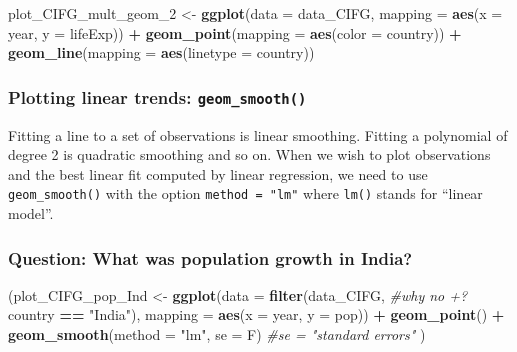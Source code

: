 \documentclass[11pt,]{article}
\newenvironment{Shaded}{\begin{snugshade}}{\end{snugshade}}
\newcommand{\KeywordTok}[1]{\textcolor[rgb]{0.13,0.29,0.53}{\textbf{#1}}}
\newcommand{\DataTypeTok}[1]{\textcolor[rgb]{0.13,0.29,0.53}{#1}}
\newcommand{\DecValTok}[1]{\textcolor[rgb]{0.00,0.00,0.81}{#1}}
\newcommand{\StringTok}[1]{\textcolor[rgb]{0.31,0.60,0.02}{#1}}
\newcommand{\CommentTok}[1]{\textcolor[rgb]{0.56,0.35,0.01}{\textit{#1}}}
\newcommand{\OperatorTok}[1]{\textcolor[rgb]{0.81,0.36,0.00}{\textbf{#1}}}
\newcommand{\NormalTok}[1]{#1}
\begin{document}
\begin{Shaded}
\begin{Highlighting}[]
\NormalTok{plot_CIFG_mult_geom_}\DecValTok{2}\NormalTok{ <-}\StringTok{ }\KeywordTok{ggplot}\NormalTok{(}\DataTypeTok{data =}\NormalTok{ data_CIFG, }
                                \DataTypeTok{mapping =} \KeywordTok{aes}\NormalTok{(}\DataTypeTok{x =}\NormalTok{ year, }
                                              \DataTypeTok{y =}\NormalTok{ lifeExp)) }\OperatorTok{+}
\StringTok{  }\KeywordTok{geom_point}\NormalTok{(}\DataTypeTok{mapping =}  \KeywordTok{aes}\NormalTok{(}\DataTypeTok{color =}\NormalTok{ country)) }\OperatorTok{+}
\StringTok{  }\KeywordTok{geom_line}\NormalTok{(}\DataTypeTok{mapping =} \KeywordTok{aes}\NormalTok{(}\DataTypeTok{linetype =}\NormalTok{ country))}
\end{Highlighting}
\end{Shaded}

\subsubsection{\texorpdfstring{Plotting linear trends:
\texttt{geom\_smooth()}}{Plotting linear trends: geom\_smooth()}}\label{plotting-linear-trends-geom_smooth}

Fitting a line to a set of observations is linear smoothing. Fitting a
polynomial of degree 2 is quadratic smoothing and so on. When we wish to
plot observations and the best linear fit computed by linear regression,
we need to use \texttt{geom\_smooth()} with the option
\texttt{method\ =\ "lm"} where \texttt{lm()} stands for ``linear
model''.

\subsubsection{Question: What was population growth in
India?}\label{question-what-was-population-growth-in-india}

\begin{Shaded}
\begin{Highlighting}[]
\NormalTok{(plot_CIFG_pop_Ind <-}\StringTok{ }\KeywordTok{ggplot}\NormalTok{(}\DataTypeTok{data =} \KeywordTok{filter}\NormalTok{(data_CIFG, }\CommentTok{#why no +?}
\NormalTok{                                           country }\OperatorTok{==}\StringTok{ "India"}\NormalTok{), }
                         \DataTypeTok{mapping =} \KeywordTok{aes}\NormalTok{(}\DataTypeTok{x =}\NormalTok{ year, }\DataTypeTok{y =}\NormalTok{ pop)) }\OperatorTok{+}
\StringTok{  }\KeywordTok{geom_point}\NormalTok{() }\OperatorTok{+}
\StringTok{  }\KeywordTok{geom_smooth}\NormalTok{(}\DataTypeTok{method =} \StringTok{"lm"}\NormalTok{, }\DataTypeTok{se =}\NormalTok{ F) }\CommentTok{#se = "standard errors"}
\NormalTok{ )}
\end{Highlighting}
\end{Shaded}
\end{document}
